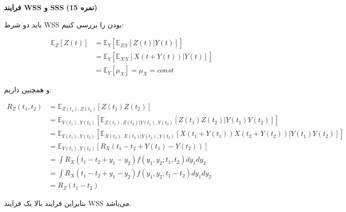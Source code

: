 \Large \textbf{فرایند WSS و SSS}
\large \textbf{(15 نمره)}

\normalsize \vspace{0.5cm}
باید دو شرط WSS بودن را بررسی کنیم:

$$
\begin{aligned}
	{\mathbb{E}_Z}\left[ {Z\left( t \right)} \right] & = {\mathbb{E}_Y}\left[ {{\mathbb{E}_{Z|Y}}\left[ {Z\left( t \right)|Y\left( t \right)} \right]} \right]\\
	&‌= {\mathbb{E}_Y}\left[ {{\mathbb{E}_{X|Y}}\left[ {X\left( {t + Y\left( t \right)} \right)|Y\left( t \right)} \right]} \right]\\
	& = {\mathbb{E}_Y}\left[ {{\mu _X}} \right] = {\mu _X} = const
\end{aligned}
$$

و همچنین داریم:

$$
\begin{aligned}
	{R_Z}\left( {{t_1},{t_2}} \right) & = {\mathbb{E}_{Z\left( {{t_1}} \right),Z\left( {{t_2}} \right)}}\left[ {Z\left( {{t_1}} \right)Z\left( {{t_2}} \right)} \right] \\
	& = {\mathbb{E}_{Y\left( {{t_1}} \right),Y\left( {{t_2}} \right)}}\left[ {{\mathbb{E}_{Z\left( {{t_1}} \right),Z\left( {{t_2}} \right)|Y\left( {{t_1}} \right),Y\left( {{t_2}} \right)}}\left[ {Z\left( {{t_1}} \right)Z\left( {{t_2}} \right)|Y\left( {{t_1}} \right)Y\left( {{t_2}} \right)} \right]} \right] \\
	&‌= {\mathbb{E}_{Y\left( {{t_1}} \right),Y\left( {{t_2}} \right)}}\left[ {{\mathbb{E}_{X\left( {{t_1}} \right),X\left( {{t_2}} \right)|Y\left( {{t_1}} \right),Y\left( {{t_2}} \right)}}\left[ {X\left( {{t_1} + Y\left( {{t_1}} \right)} \right)X\left( {{t_2} + Y\left( {{t_2}} \right)} \right)|Y\left( {{t_1}} \right)Y\left( {{t_2}} \right)} \right]} \right]\\
	& = {\mathbb{E}_{Y\left( {{t_1}} \right),Y\left( {{t_2}} \right)}}\left[ {{R_X}\left( {{t_1} - {t_2} + Y\left( {{t_1}} \right) - Y\left( {{t_2}} \right)} \right)} \right]\\
	& = \int {{R_X}\left( {{t_1} - {t_2} + {y_1} - {y_2}} \right)f\left( {{y_1},{y_2};{t_1},{t_2}} \right)d{y_1}d{y_2}} \\
	&‌= \int {{R_X}\left( {{t_1} - {t_2} + {y_1} - {y_2}} \right)f\left( {{y_1},{y_2};{t_1} - {t_2}} \right)d{y_1}d{y_2}} \\
	&‌= {R_Z}\left( {{t_1} - {t_2}} \right)
\end{aligned}
$$


بنابراین فرایند بالا یک فرایند WSS می‌باشد.
